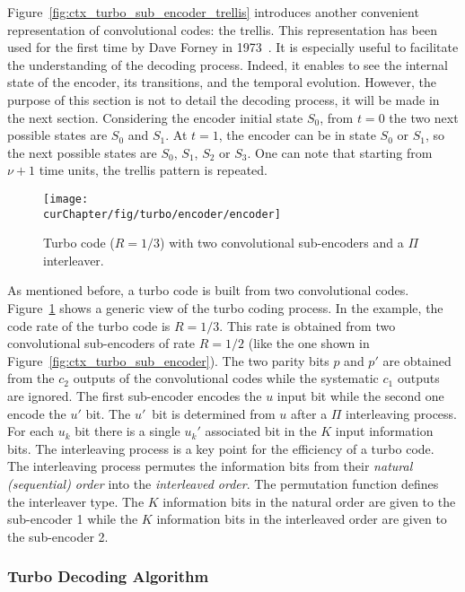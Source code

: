 Figure~\ref{fig:ctx_turbo_sub_encoder_trellis} introduces another convenient
representation of convolutional codes: the trellis. This representation has
been used for the first time by Dave Forney in 1973~\cite{Forney1973}. It is
especially useful to facilitate the understanding of the decoding process.
Indeed, it enables to see the internal state of the encoder, its transitions,
and the temporal evolution. However, the purpose of this section is not to
detail the decoding process, it will be made in the next section. Considering
the encoder initial state $S_0$, from $t = 0$ the two next possible states are
$S_0$ and $S_1$. At $t = 1$, the encoder can be in state $S_0$ or $S_1$, so the
next possible states are $S_0$, $S_1$, $S_2$ or $S_3$. One can note that
starting from $\nu +1$ time units, the trellis pattern is repeated.

\begin{figure}[htp]
  \centering
  \texttt{[image: \\curChapter/fig/turbo/encoder/encoder]}
  \caption{Turbo code ($R = 1/3$) with two convolutional sub-encoders and a
    $\Pi$ interleaver.}
  \label{fig:ctx_turbo_encoder}
\end{figure}

As mentioned before, a turbo code is built from two convolutional codes.
Figure~\ref{fig:ctx_turbo_encoder} shows a generic view of the turbo coding
process. In the example, the code rate of the turbo code is $R = 1/3$. This rate
is obtained from two convolutional sub-encoders of rate $R = 1/2$ (like the one
shown in Figure~\ref{fig:ctx_turbo_sub_encoder}). The two parity bits $p$ and
$p'$ are obtained from the $c_2$ outputs of the convolutional codes while the
systematic $c_1$ outputs are ignored. The first sub-encoder encodes the $u$
input bit while the second one encode the $u'$ bit. The $u'$~bit is determined
from $u$ after a $\Pi$ interleaving process. For each $u_k$ bit there is a
single $u_k'$ associated bit in the $K$ input information bits. The interleaving
process is a key point for the efficiency of a turbo code. The interleaving
process permutes the information bits from their \emph{natural
(sequential) order} into the \emph{interleaved order}. The permutation function
defines the interleaver type. The $K$ information bits in the natural order are
given to the sub-encoder 1 while the $K$ information bits in the interleaved
order are given to the sub-encoder 2.

\subsubsection{Turbo Decoding Algorithm}
\label{sec:turbo_overview}

